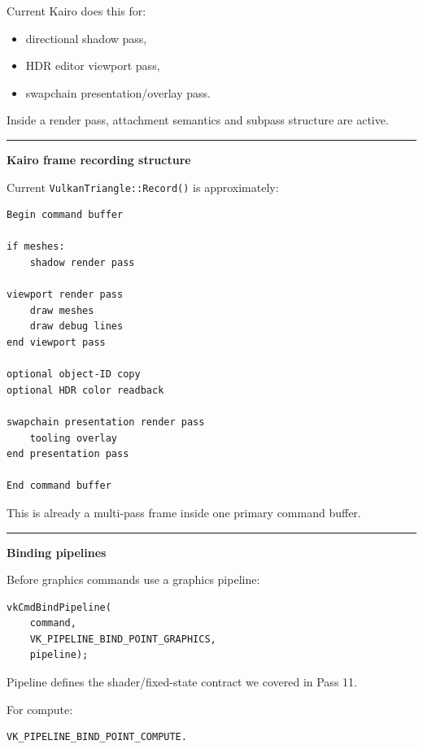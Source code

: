 Current Kairo does this for:

\begin{itemize}
\tightlist
\item
  directional shadow pass,
\item
  HDR editor viewport pass,
\item
  swapchain presentation/overlay pass.
\end{itemize}

Inside a render pass, attachment semantics and subpass structure are active.

\begin{center}\rule{0.5\linewidth}{0.5pt}\end{center}

\textbf{Kairo frame recording structure}

Current \texttt{VulkanTriangle::Record()} is approximately:

\begin{verbatim}
Begin command buffer

if meshes:
    shadow render pass

viewport render pass
    draw meshes
    draw debug lines
end viewport pass

optional object-ID copy
optional HDR color readback

swapchain presentation render pass
    tooling overlay
end presentation pass

End command buffer
\end{verbatim}

This is already a multi-pass frame inside one primary command buffer.

\begin{center}\rule{0.5\linewidth}{0.5pt}\end{center}

\textbf{Binding pipelines}

Before graphics commands use a graphics pipeline:

\begin{verbatim}
vkCmdBindPipeline(
    command,
    VK_PIPELINE_BIND_POINT_GRAPHICS,
    pipeline);
\end{verbatim}

Pipeline defines the shader/fixed-state contract we covered in Pass 11.

For compute:

\begin{verbatim}
VK_PIPELINE_BIND_POINT_COMPUTE.
\end{verbatim}

